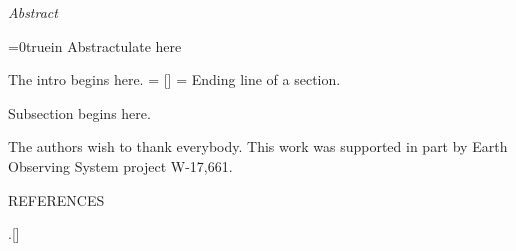 \bigskip
\centerline{\it Abstract}
\smallskip
\baselineskip=20pt
{\parindent=0truein \narrower \smallskip \ninerm
\noindent
Abstractulate here
\smallskip}
\baselineskip=20pt
\vfill\eject
%


The intro begins here. 
\headline={ \hfil [\oldstyle\folio\tenrm]}
\footline={\hfil}
%
Ending line of a section.
\medskip
{}\nobreak

Subsection begins here.


%
\medskip
\baselineskip=20pt
The authors wish to thank everybody.
This work was supported in part by Earth Observing System project
W-17,661. 
\baselineskip=20pt
%
\vfill\eject

%

\centerline{REFERENCES}
\bigskip
.[]
\vfill\eject

